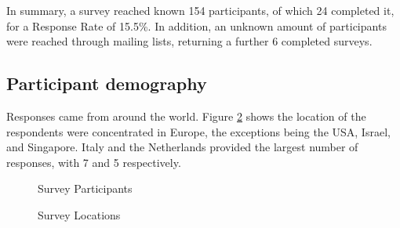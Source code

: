 In summary, a survey reached known 154 participants, of which 24 completed it, for a Response Rate of 15.5\%.
In addition, an unknown amount of participants were reached through mailing lists, returning a further 6 completed surveys.

\subsection{Participant demography}

Responses came from around the world.
Figure \ref{fig:Survey_locations} shows the location of the respondents were concentrated in Europe, the exceptions being the USA, Israel, and Singapore.
Italy and the Netherlands provided the largest number of responses, with 7 and 5 respectively.

\begin{figure}[H]
    \centering
    \caption{Survey Participants}
    \label{fig:Survey_participants}
\end{figure}

\begin{figure}[H]
    \centering
    \caption{Survey Locations}
    \label{fig:Survey_locations}
\end{figure}

